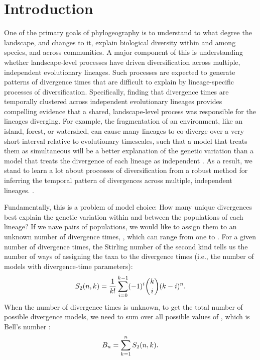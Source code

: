 \section{Introduction}

One of the primary goals of phylogeography is to understand to what degree the
landscape, and changes to it, explain biological diversity within and among
species, and across communities.
A major component of this is understanding whether landscape-level processes
have driven diversification across multiple, independent evolutionary lineages.
Such processes are expected to generate patterns of divergence times
that are difficult to explain by lineage-specific processes of 
diversification.
Specifically, finding that divergence times are temporally clustered across
independent evolutionary lineages provides compelling evidence that a shared,
landscape-level process was responsible for the lineages diverging.
For example, the fragmentation of an environment, like an island, forest, or
watershed, can cause many lineages to co-diverge over a very short interval
relative to evolutionary timescales, such that a model that treats them as
simultaneous will be a better explanation of the genetic variation than a model
that treats the divergence of each lineage as independent \figureNeeded.
As a result, we stand to learn a lot about processes of diversification from a
robust method for inferring the temporal pattern of divergences across
multiple, independent lineages.
.

\begin{linenomath}
Fundamentally, this is a problem of model choice:
How many unique divergences best explain the genetic variation within and
between the populations of each lineage?
If we nave \ncomparisons pairs of populations, we would like to assign them to an
unknown number of divergence times, \nevents, which can range from one to
\ncomparisons.
For a given number of divergence times, the Stirling number of the second kind
tells us the number of ways of assigning the taxa to the divergence times
(i.e., the number of models with \nevents divergence-time parameters):
\begin{equation}
    S_2(n, k_{}) = 
    \frac{1}{k_{}!} \sum_{i = 0}^{k_{} - 1} (-1)^{i}
    \binom{k_{}}{i} (k_{} - i)^{n}.
    \label{eq:stirling2}
\end{equation}
When the number of divergence times is unknown, to get the total
number of possible divergence models, we need to sum over
all possible values of \nevents, which is Bell's number \citep{Bell1934}:
\begin{equation}
    B_{n} = \sum_{k_{} = 1}^{n}
    S_2(n, k_{}).
    \label{eq:bell}
\end{equation}
\end{linenomath}

